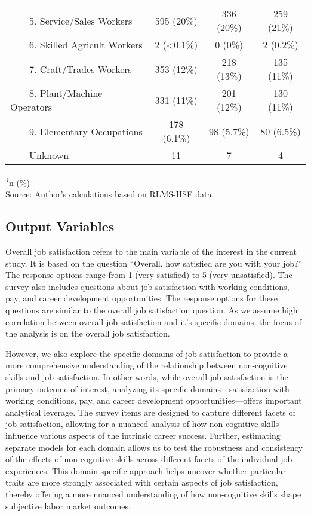 \documentclass[
]{interact}
\begin{document}
\begin{table}
{\begin{tabular*}{\linewidth}{@{\extracolsep{\fill}}lccc}
    5. Service/Sales Workers & 595 (20\%) & 336 (20\%) & 259 (21\%) \\ 
    6. Skilled Agricult Workers & 2 (<0.1\%) & 0 (0\%) & 2 (0.2\%) \\ 
    7. Craft/Trades Workers & 353 (12\%) & 218 (13\%) & 135 (11\%) \\ 
    8. Plant/Machine Operators & 331 (11\%) & 201 (12\%) & 130 (11\%) \\ 
    9. Elementary Occupations & 178 (6.1\%) & 98 (5.7\%) & 80 (6.5\%) \\ 
    Unknown & 11 & 7 & 4 \\ 
\bottomrule
\end{tabular*}
\begin{minipage}{\linewidth}
\textsuperscript{\textit{1}}n (\%)\\
Source: Author's calculations based on RLMS-HSE data\\
\end{minipage}

}

\end{table}%

\subsection{Output Variables}\label{output-variables}

Overall job satisfaction refers to the main variable of the interest in
the current study. It is based on the question ``Overall, how satisfied
are you with your job?'' The response options range from 1 (very
satisfied) to 5 (very unsatisfied). The survey also includes questions
about job satisfaction with working conditions, pay, and career
development opportunities. The response options for these questions are
similar to the overall job satisfaction question. As we assume high
correlation between overall job satisfaction and it's specific domains,
the focus of the analysis is on the overall job satisfaction.

However, we also explore the specific domains of job satisfaction to
provide a more comprehensive understanding of the relationship between
non-cognitive skills and job satisfaction. In other words, while overall
job satisfaction is the primary outcome of interest, analyzing its
specific domains---satisfaction with working conditions, pay, and career
development opportunities---offers important analytical leverage. The
survey items are designed to capture different facets of job
satisfaction, allowing for a nuanced analysis of how non-cognitive
skills influence various aspects of the intrinsic career success.
Further, estimating separate models for each domain allows us to test
the robustness and consistency of the effects of non-cognitive skills
across different facets of the individual job experiences. This
domain-specific approach helps uncover whether particular traits are
more strongly associated with certain aspects of job satisfaction,
thereby offering a more nuanced understanding of how non-cognitive
skills shape subjective labor market outcomes.
\end{document}

